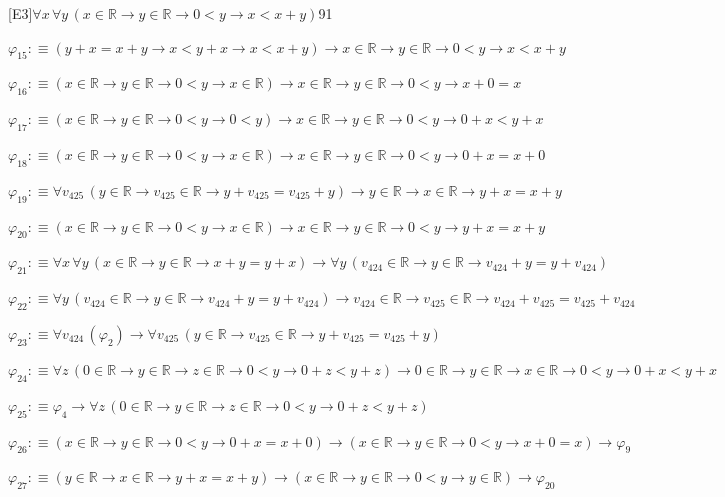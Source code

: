 \begin{fullproof}{[E3]}{$\forall x\,\forall y\,(x \in \mathbb{R} \to y \in \mathbb{R} \to 0 < y \to x < x + y)$}{91}
\begin{abbrevlist}
\item $\varphi_{15} :\equiv (y + x = x + y \to x < y + x \to x < x + y) \to x \in \mathbb{R} \to y \in \mathbb{R} \to 0 < y \to x < x + y$
\item $\varphi_{16} :\equiv (x \in \mathbb{R} \to y \in \mathbb{R} \to 0 < y \to x \in \mathbb{R}) \to x \in \mathbb{R} \to y \in \mathbb{R} \to 0 < y \to x + 0 = x$
\item $\varphi_{17} :\equiv (x \in \mathbb{R} \to y \in \mathbb{R} \to 0 < y \to 0 < y) \to x \in \mathbb{R} \to y \in \mathbb{R} \to 0 < y \to 0 + x < y + x$
\item $\varphi_{18} :\equiv (x \in \mathbb{R} \to y \in \mathbb{R} \to 0 < y \to x \in \mathbb{R}) \to x \in \mathbb{R} \to y \in \mathbb{R} \to 0 < y \to 0 + x = x + 0$
\item $\varphi_{19} :\equiv \forall v_{425}\,(y \in \mathbb{R} \to v_{425} \in \mathbb{R} \to y + v_{425} = v_{425} + y) \to y \in \mathbb{R} \to x \in \mathbb{R} \to y + x = x + y$
\item $\varphi_{20} :\equiv (x \in \mathbb{R} \to y \in \mathbb{R} \to 0 < y \to x \in \mathbb{R}) \to x \in \mathbb{R} \to y \in \mathbb{R} \to 0 < y \to y + x = x + y$
\item $\varphi_{21} :\equiv \forall x\,\forall y\,(x \in \mathbb{R} \to y \in \mathbb{R} \to x + y = y + x) \to \forall y\,(v_{424} \in \mathbb{R} \to y \in \mathbb{R} \to v_{424} + y = y + v_{424})$
\item $\varphi_{22} :\equiv \forall y\,(v_{424} \in \mathbb{R} \to y \in \mathbb{R} \to v_{424} + y = y + v_{424}) \to v_{424} \in \mathbb{R} \to v_{425} \in \mathbb{R} \to v_{424} + v_{425} = v_{425} + v_{424}$
\item $\varphi_{23} :\equiv \forall v_{424}\,(\varphi_{2}) \to \forall v_{425}\,(y \in \mathbb{R} \to v_{425} \in \mathbb{R} \to y + v_{425} = v_{425} + y)$
\item $\varphi_{24} :\equiv \forall z\,(0 \in \mathbb{R} \to y \in \mathbb{R} \to z \in \mathbb{R} \to 0 < y \to 0 + z < y + z) \to 0 \in \mathbb{R} \to y \in \mathbb{R} \to x \in \mathbb{R} \to 0 < y \to 0 + x < y + x$
\item $\varphi_{25} :\equiv \varphi_{4} \to \forall z\,(0 \in \mathbb{R} \to y \in \mathbb{R} \to z \in \mathbb{R} \to 0 < y \to 0 + z < y + z)$
\item $\varphi_{26} :\equiv (x \in \mathbb{R} \to y \in \mathbb{R} \to 0 < y \to 0 + x = x + 0) \to (x \in \mathbb{R} \to y \in \mathbb{R} \to 0 < y \to x + 0 = x) \to \varphi_{9}$
\item $\varphi_{27} :\equiv (y \in \mathbb{R} \to x \in \mathbb{R} \to y + x = x + y) \to (x \in \mathbb{R} \to y \in \mathbb{R} \to 0 < y \to y \in \mathbb{R}) \to \varphi_{20}$

\end{abbrevlist}
\end{fullproof}
